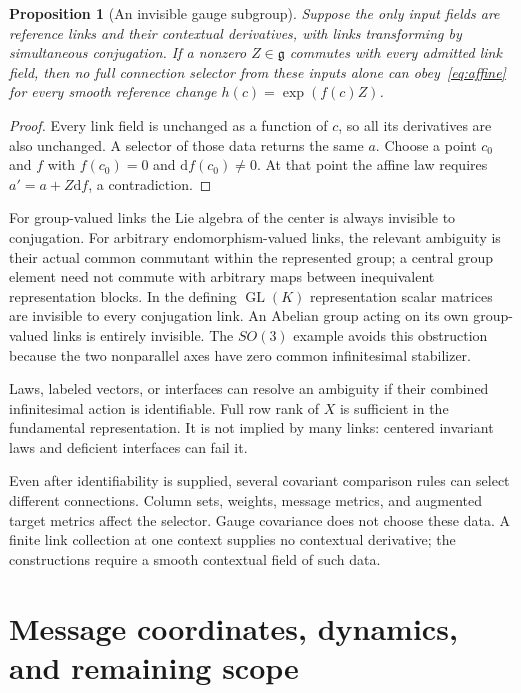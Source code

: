\documentclass[11pt]{article}
\newtheorem{proposition}[theorem]{Proposition}
\newcommand{\GL}{\operatorname{GL}}
\newcommand{\dd}{\mathrm d}
\begin{document}
\begin{proposition}[An invisible gauge subgroup]
Suppose the only input fields are reference links and their contextual derivatives, with links transforming by simultaneous conjugation. If a nonzero $Z\in\mathfrak g$ commutes with every admitted link field, then no full connection selector from these inputs alone can obey~\eqref{eq:affine} for every smooth reference change $h(c)=\exp(f(c)Z)$.
\end{proposition}
\begin{proof}
Every link field is unchanged as a function of $c$, so all its derivatives are also unchanged. A selector of those data returns the same $a$. Choose a point $c_0$ and $f$ with $f(c_0)=0$ and $\dd f(c_0)\ne0$. At that point the affine law requires $a'=a+Z\dd f$, a contradiction.
\end{proof}

For group-valued links the Lie algebra of the center is always invisible to conjugation. For arbitrary endomorphism-valued links, the relevant ambiguity is their actual common commutant within the represented group; a central group element need not commute with arbitrary maps between inequivalent representation blocks. In the defining $\GL(K)$ representation scalar matrices are invisible to every conjugation link. An Abelian group acting on its own group-valued links is entirely invisible. The $SO(3)$ example avoids this obstruction because the two nonparallel axes have zero common infinitesimal stabilizer.

Laws, labeled vectors, or interfaces can resolve an ambiguity if their combined infinitesimal action is identifiable. Full row rank of $X$ is sufficient in the fundamental representation. It is not implied by many links: centered invariant laws and deficient interfaces can fail it.

Even after identifiability is supplied, several covariant comparison rules can select different connections. Column sets, weights, message metrics, and augmented target metrics affect the selector. Gauge covariance does not choose these data. A finite link collection at one context supplies no contextual derivative; the constructions require a smooth contextual field of such data.

\section{Message coordinates, dynamics, and remaining scope}
\label{sec:message-connection}
\end{document}

